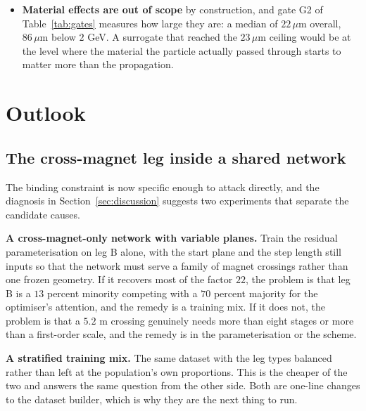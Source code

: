 \documentclass[11pt,a4paper]{article}
\newcommand{\um}{\ensuremath{\,\mu\mathrm{m}}}
\begin{document}
\begin{itemize}
  single-threaded and the July runs used four threads. A different reduction
  order changes the last bits, and $200$ line-searched iterations amplify that
  into the fourth significant digit, so comparisons across that boundary are
  made at the level of seed ranges. The stage sweep at $q = 8$ gives $165$ to
  $240\um$ against the July baseline's $177$ to $235\um$ on a dataset checked
  bitwise identical, which is the agreement one should expect and not better.
  \item \textbf{Material effects are out of scope} by construction, and gate G2
  of Table~\ref{tab:gates} measures how large they are: a median of $22\um$
  overall, $86\um$ below $2$ GeV. A surrogate that reached the $23\um$ ceiling
  would be at the level where the material the particle actually passed through
  starts to matter more than the propagation.
\end{itemize}

\section{Outlook}
\label{sec:outlook}

\subsection{The cross-magnet leg inside a shared network}

The binding constraint is now specific enough to attack directly, and the
diagnosis in Section~\ref{sec:discussion} suggests two experiments that separate
the candidate causes.

\textbf{A cross-magnet-only network with variable planes.} Train the residual
parameterisation on leg B alone, with the start plane and the step length still
inputs so that the network must serve a family of magnet crossings rather than
one frozen geometry. If it recovers most of the factor $22$, the problem is that
leg B is a $13$ percent minority competing with a $70$ percent majority for the
optimiser's attention, and the remedy is a training mix. If it does not, the
problem is that a $5.2$ m crossing genuinely needs more than eight stages or
more than a first-order scale, and the remedy is in the parameterisation or the
scheme.

\textbf{A stratified training mix.} The same dataset with the leg types balanced
rather than left at the population's own proportions. This is the cheaper of the
two and answers the same question from the other side. Both are one-line changes
to the dataset builder, which is why they are the next thing to run.
\end{document}
